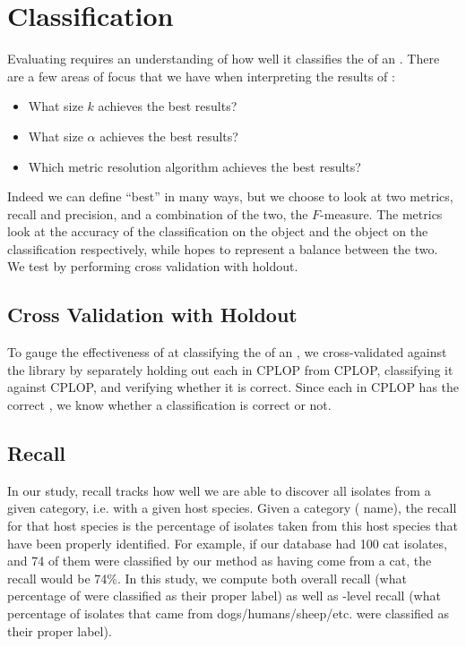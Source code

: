 \section{\Spec{} Classification}\label{sec:validation:classification}

Evaluating \krap{} requires an understanding of how well it classifies the \spec{} of an \isol{}.
There are a few areas of focus that we have when interpreting the results of \krap{}:
\begin{itemize}
\item What size $k$ achieves the best results?
\item What size $\alpha$ achieves the best results?
\item Which metric resolution algorithm achieves the best results?
\end{itemize}
Indeed we can define ``best'' in many ways, but we choose to look at two metrics, recall and precision, and a combination of the two, the $F$-measure. The metrics look at the accuracy of the classification on the object and the object on the classification respectively, while \fmeasure{} hopes to represent a balance between the two. 
We test \krap{} by performing cross validation with holdout.

\subsection{Cross Validation with Holdout}
To gauge the effectiveness of \krap{} at classifying the \spec{} of an \isol{}, we cross-validated against the library by separately holding out each \isol{} in CPLOP from CPLOP, classifying it against CPLOP, and verifying whether it is correct. 
Since each \isol{} in CPLOP has the correct \spec{}, we know whether a classification is correct or not.

\subsection{Recall}
In our study, recall tracks how well we are able to discover all isolates from a given category, i.e. with a given host species.
Given a category (\spec{} name), the recall for that host species is the percentage of isolates taken from this host species that have been properly identified.
For example, if our database had 100 cat isolates, and 74 of them were classified by our method as having come from a cat, the recall would be 74\%.
In this study, we compute both overall recall (what percentage of \isols{} were classified as their proper \spec{} label) as well as \spec{}-level recall (what percentage of isolates that came from dogs/humans/sheep/etc. were classified
as their proper label).

